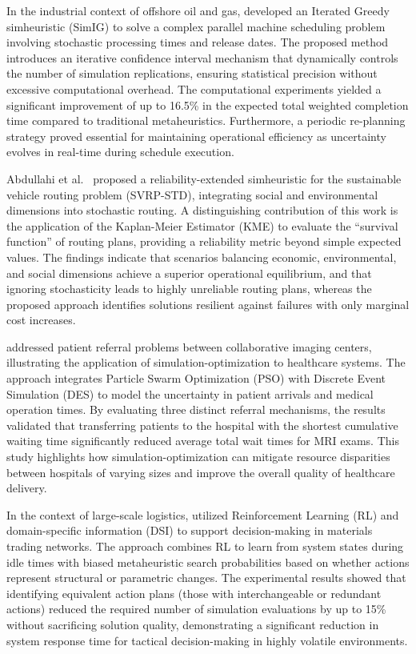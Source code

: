 In the industrial context of offshore oil and gas, \cite{abumarrul2023simheuristic} developed an Iterated Greedy simheuristic (SimIG) to solve a complex parallel machine scheduling problem involving stochastic processing times and release dates. The proposed method introduces an iterative confidence interval mechanism that dynamically controls the number of simulation replications, ensuring statistical precision without excessive computational overhead. The computational experiments yielded a significant improvement of up to 16.5\% in the expected total weighted completion time compared to traditional metaheuristics. Furthermore, a periodic re-planning strategy proved essential for maintaining operational efficiency as uncertainty evolves in real-time during schedule execution.

Abdullahi et al.~\cite{abdullahi:2025} proposed a reliability-extended simheuristic for the sustainable vehicle routing problem (SVRP-STD), integrating social and environmental dimensions into stochastic routing. A distinguishing contribution of this work is the application of the Kaplan-Meier Estimator (KME) to evaluate the ``survival function'' of routing plans, providing a reliability metric beyond simple expected values. The findings indicate that scenarios balancing economic, environmental, and social dimensions achieve a superior operational equilibrium, and that ignoring stochasticity leads to highly unreliable routing plans, whereas the proposed approach identifies solutions resilient against failures with only marginal cost increases.

\cite{chen2017development} addressed patient referral problems between collaborative imaging centers, illustrating the application of simulation-optimization to healthcare systems. The approach integrates Particle Swarm Optimization (PSO) with Discrete Event Simulation (DES) to model the uncertainty in patient arrivals and medical operation times. By evaluating three distinct referral mechanisms, the results validated that transferring patients to the hospital with the shortest cumulative waiting time significantly reduced average total wait times for MRI exams. This study highlights how simulation-optimization can mitigate resource disparities between hospitals of varying sizes and improve the overall quality of healthcare delivery.

In the context of large-scale logistics, \cite{rabe:2021} utilized Reinforcement Learning (RL) and domain-specific information (DSI) to support decision-making in materials trading networks. The approach combines RL to learn from system states during idle times with biased metaheuristic search probabilities based on whether actions represent structural or parametric changes. The experimental results showed that identifying equivalent action plans (those with interchangeable or redundant actions) reduced the required number of simulation evaluations by up to 15\% without sacrificing solution quality, demonstrating a significant reduction in system response time for tactical decision-making in highly volatile environments.


